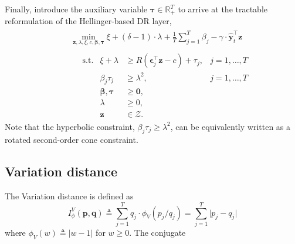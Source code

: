 \documentclass[10pt, twocolumn]{article}
\theoremstyle{plain}
\theoremstyle{definition}
\begin{document}
\begin{appendices}
Finally, introduce the auxiliary variable \(\bm{\tau}\in\mathbb{R}_+^T\) to 
arrive at the tractable reformulation of the Hellinger-based DR layer,
\[
\begin{aligned}
	&\begin{aligned}
	&\min_{\bm{z}, \lambda, \xi, c, \bm{\beta}, \bm{\tau}} \xi + 
	(\delta-1)\cdot \lambda + \frac{1}{T} \sum_{j=1}^T \beta_j  
	- \gamma \cdot \hat{\bm{y}}_{t}^\top \bm{z}
	\end{aligned}\\
	&\begin{aligned}
	&\quad\ \ \text{s.t.} & \xi + \lambda &\geq R(\bm{\epsilon}_j^\top \bm{z} - c) 
	+ \tau_j, & j=1,\dots,T\\
	&& \beta_j \tau_j &\geq \lambda^2, & j=1,\dots,T\\
	&& \bm{\beta}, \bm{\tau} &\geq \bm{0},\\
	&& \lambda &\geq 0,\\
	&& \bm{z} &\in\mathcal{Z}.
	\end{aligned}	
\end{aligned}
\]
Note that the hyperbolic constraint, \(\beta_j \tau_j \geq \lambda^2\), can be 
equivalently written as a rotated second-order cone constraint.


\subsection{Variation distance} 
The Variation distance is defined as 
\[
	I_\phi^V(\bm{p},\bm{q}) \triangleq \sum_{j=1}^T q_j\cdot \phi_V(p_j/q_j) =
	 \sum_{j=1}^T \big| p_j - q_j \big|
\]
where \(\phi_V(w) \triangleq |w - 1|\) for \(w\geq 0\). %
The
conjugate %


\end{appendices}
\end{document}
